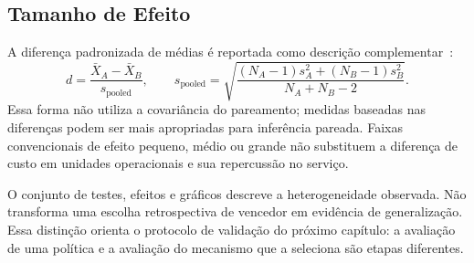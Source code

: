 \subsection{Tamanho de Efeito}

A diferença padronizada de médias é reportada como descrição complementar~\citep{Cohen1988StatisticalPower}:
\begin{equation}
d=\frac{\bar X_A-\bar X_B}{s_{\mathrm{pooled}}},\qquad
s_{\mathrm{pooled}}=\sqrt{\frac{(N_A-1)s_A^2+(N_B-1)s_B^2}{N_A+N_B-2}}.
\label{eq:cohens_d}
\end{equation}
Essa forma não utiliza a covariância do pareamento; medidas baseadas nas diferenças podem ser mais apropriadas para inferência pareada. Faixas convencionais de efeito pequeno, médio ou grande não substituem a diferença de custo em unidades operacionais e sua repercussão no serviço.

O conjunto de testes, efeitos e gráficos descreve a heterogeneidade observada. Não transforma uma escolha retrospectiva de vencedor em evidência de generalização. Essa distinção orienta o protocolo de validação do próximo capítulo: a avaliação de uma política e a avaliação do mecanismo que a seleciona são etapas diferentes.
